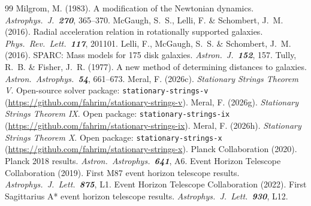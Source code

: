 \documentclass[12pt,a4paper]{article}
\begin{document}
\begin{thebibliography}{99}
     Milgrom, M. (1983). A modification of the Newtonian dynamics.
    \textit{Astrophys.\ J.\ \textbf{270}}, 365--370.
     McGaugh, S.~S., Lelli, F. \& Schombert, J.~M. (2016).
    Radial acceleration relation in rotationally supported galaxies.
    \textit{Phys.\ Rev.\ Lett.\ \textbf{117}}, 201101.
     Lelli, F., McGaugh, S.~S. \& Schombert, J.~M. (2016).
    SPARC: Mass models for 175 disk galaxies.
    \textit{Astron.\ J.\ \textbf{152}}, 157.
     Tully, R.~B. \& Fisher, J.~R. (1977). A new method of
    determining distances to galaxies. \textit{Astron.\ Astrophys.\ \textbf{54}}, 661--673.
     Meral, F. (2026c). \textit{Stationary Strings Theorem V}.
    Open-source solver package: \texttt{stationary-strings-v}
    (\url{https://github.com/fahrim/stationary-strings-v}).
     Meral, F. (2026g). \textit{Stationary Strings Theorem IX}.
    Open package: \texttt{stationary-strings-ix}
    (\url{https://github.com/fahrim/stationary-strings-ix}).
     Meral, F. (2026h). \textit{Stationary Strings Theorem X}.
    Open package: \texttt{stationary-strings-x}
    (\url{https://github.com/fahrim/stationary-strings-x}).
     Planck Collaboration (2020). Planck 2018 results.
    \textit{Astron.\ Astrophys.\ \textbf{641}}, A6.
     Event Horizon Telescope Collaboration (2019).
    First M87 event horizon telescope results. \textit{Astrophys.\ J.\ Lett.\
    \textbf{875}}, L1.
     Event Horizon Telescope Collaboration (2022).
    First Sagittarius A* event horizon telescope results.
    \textit{Astrophys.\ J.\ Lett.\ \textbf{930}}, L12.
\end{thebibliography}
\end{document}
